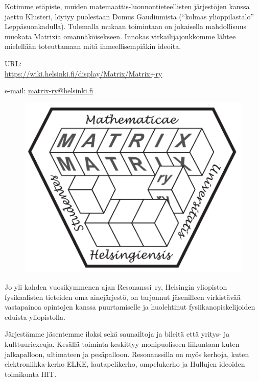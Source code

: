 \documentclass[a5paper, 8pt, twocolumn]{book} %
\numberwithin{equation}{section}
\begin{document}
Kotimme etäpiste, muiden ma\-te\-maat\-tis-luon\-non\-tie\-teel\-lis\-ten järjestöjen kanssa jaettu Klusteri, löytyy puolestaan Domus
Gaudiumista (``kolmas yli\-oppilas\-talo'' Leppä\-suon\-kadulla).
Tulemalla mukaan toimintaan
on jokaisella mahdollisuus muokata
Matrixia oman\-näköisekseen. Innokas virkailija\-joukkomme
lähtee mielellään toteuttamaan
mitä ihmeellisempiäkin ideoita.

\noindent URL:\\\url{https://wiki.helsinki.fi/display/Matrix/Matrix+ry}

\noindent e-mail: \url{matrix-ry@helsinki.fi}

\begin{figure}[!b]
	\centering
	\includegraphics[width=0.9\columnwidth]{matrix.png}
\end{figure}

Jo yli kahden vuosikymmenen ajan Resonanssi~ry, Helsingin yliopiston fysikaalisten
tieteiden oma ainejärjestö, on tarjonnut
jäsenilleen virkistävää vastapainoa opintojen
kanssa puurtamiselle ja huolehtinut
fysiikanopiskelijoiden eduista yliopistolla.

Järjestämme jäsentemme iloksi sekä
saunailtoja ja bileitä että yritys- ja kulttuuriexcuja.
Kesällä toiminta keskittyy monipuoliseen
liikuntaan kuten jalkapalloon, ultimateen
ja pesäpalloon. Resonanssilla on
myös kerhoja, kuten elektroniikka-kerho
ELKE, lautapelikerho, ompelukerho ja Hullujen
ideoiden toimikunta HIT.
\end{document}
